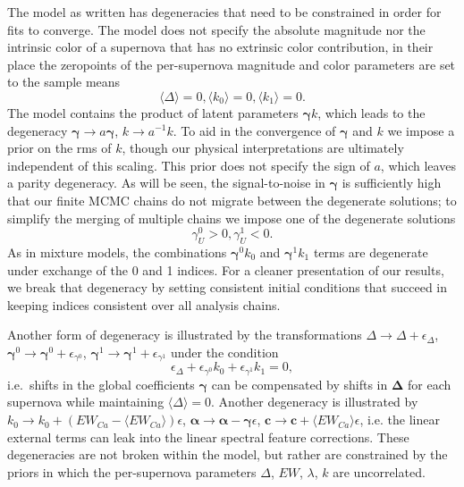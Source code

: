 \documentclass{aastex61}   	%
\begin{document}
The model as written has degeneracies that need to be constrained in order for fits to converge.
The model does not specify the absolute magnitude nor the intrinsic color of a supernova that has no extrinsic color contribution,
in their place the zeropoints of the per-supernova magnitude and color parameters are set to the sample means
\begin{equation}
\langle \Delta \rangle=0, \langle k_0 \rangle=0, \langle k_1 \rangle=0.
\end{equation}
The model contains the product of latent parameters
$\pmb{\gamma} k$, which leads to the degeneracy $\pmb{\gamma} \rightarrow a\pmb{\gamma}$, $k \rightarrow a^{-1} k$.
To aid in the convergence of $\pmb{\gamma}$ and $k$ we impose a prior on the rms of $k$, though
our physical interpretations are ultimately independent of this scaling.
This prior does not specify the sign of $a$, which leaves a parity degeneracy.  As will be seen, the signal-to-noise in $\pmb{\gamma}$ is sufficiently
high that our finite MCMC chains do not migrate between the degenerate solutions; to simplify the merging of multiple chains
we impose one of the degenerate solutions
\begin{equation}
\gamma^0_U > 0, \gamma^1_U < 0.
\end{equation}
As  in mixture models, the combinations $\pmb{\gamma}^0 k_0$ and $\pmb{\gamma}^1 k_1$ terms are degenerate under exchange of the 0 and 1 indices. For a cleaner presentation of our results, 
we break that degeneracy  by setting consistent initial conditions that succeed in keeping indices consistent over all analysis chains.  


Another form of degeneracy is illustrated by the  transformations $\Delta \rightarrow \Delta  + \epsilon_\Delta$,
 $\pmb{\gamma}^0 \rightarrow \pmb{\gamma}^0  + \epsilon_{\gamma^0}$, $\pmb{\gamma}^1 \rightarrow \pmb{\gamma}^1 + \epsilon_{\gamma^1}$
 under the condition
$$
\epsilon_\Delta  +  \epsilon_{\gamma^0} k_0+  \epsilon_{\gamma^1} k_1=0,
$$
i.e.\ shifts in the global coefficients $\pmb{\gamma}$ can be compensated by shifts in $\pmb{\Delta}$ for each supernova while maintaining 
$\langle \Delta \rangle=0$.
Another degeneracy is illustrated by $k_0 \rightarrow k_0 + (EW_{Ca}-\langle EW_{Ca}\rangle)\epsilon$,
$\pmb{\alpha} \rightarrow \pmb{\alpha} - \pmb{\gamma} \epsilon$, $\mathbf{c} \rightarrow \mathbf{c} + \langle EW_{Ca}\rangle \epsilon$, i.e. the
linear external terms can leak into the linear spectral feature corrections.
These degeneracies are not broken within the model, but rather are constrained by the priors in which the
per-supernova parameters
$\Delta$, $EW$, $\lambda$, $k$ are uncorrelated. 
\end{document}
